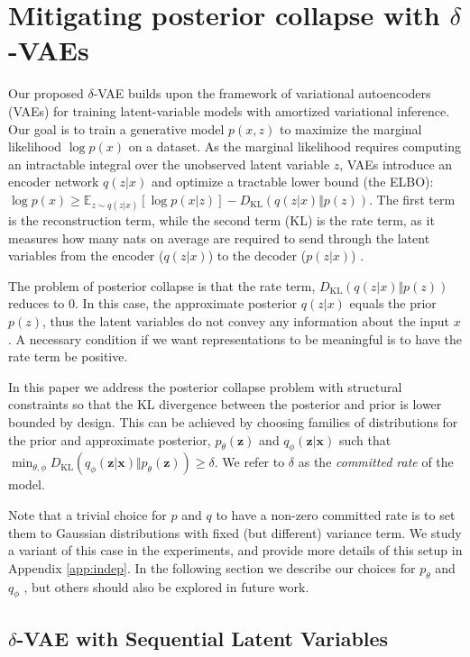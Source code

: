 \documentclass{article} \usepackage{iclr2019_conference,times}
\def\rvx{{\mathbf{x}}}
\def\rvz{{\mathbf{z}}}
\newcommand{\KL}{D_{\mathrm{KL}}}
\begin{document}
 \section{Mitigating posterior collapse with $\delta$-VAEs}
Our proposed $\delta$-VAE builds upon the framework of variational autoencoders (VAEs) \citep{VAE, Rezende2014} for training latent-variable models with amortized variational inference. Our goal is to train a generative model $p(x, z)$ to maximize the marginal likelihood $\log p(x)$ on a dataset. As the marginal likelihood requires computing an intractable integral over the unobserved latent variable $z$, VAEs introduce an encoder network $q(z|x)$ and optimize a tractable lower bound (the ELBO): $\log p(x) \ge \mathbb{E}_{z \sim q(z|x)}\left[\log p(x|z)\right] - \KL(q(z|x) \Vert p(z))$. The first term is the reconstruction term, while the second term (KL) is the rate term, as it measures how many nats on average are required to send through the latent variables from the encoder ($q(z|x)$) to the decoder ($p(z|x)$) \citep{Hoffman2016, Alemi2017}.

The problem of posterior collapse is that the rate term, $\KL(q(z|x) \Vert p(z))$ reduces to 0. In this case, the approximate posterior $q(z|x)$ equals the prior $p(z)$, thus the latent variables do not convey any information about the input $x$. A necessary condition if we want representations to be meaningful is to have the rate term be positive.


In this paper we address the posterior collapse problem with structural constraints so that the KL divergence between the  posterior and prior is lower bounded by design.
This can be achieved by choosing families of distributions for the prior and approximate posterior, $p_\theta(\rvz)$ and $q_\phi(\rvz|\rvx)$ such that $\min_{\theta,\phi} \KL(q_\phi(\rvz|\rvx) \Vert p_\theta(\rvz)) \geq \delta$. We refer to $\delta$ as the \emph{committed rate} of the model. 

Note that a trivial choice for $p$ and $q$ to have a non-zero committed rate is to set them to Gaussian distributions with fixed (but different) variance term. We study a variant of this case in the experiments, and provide more details of this setup in Appendix \ref{app:indep}. In the following section we describe our choices for $p_\theta$ and $q_\phi$ , but others should also be explored in future work.


\subsection{$\delta$-VAE with Sequential Latent Variables}
\end{document}
